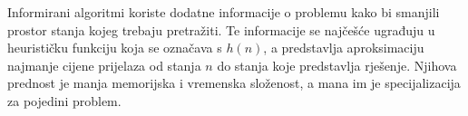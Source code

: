 Informirani algoritmi  koriste dodatne informacije o problemu kako bi smanjili prostor stanja kojeg trebaju pretražiti. 
Te informacije se najčešće ugrađuju u heurističku funkciju  koja se označava s \( h(n) \), a predstavlja aproksimaciju najmanje cijene prijelaza od stanja \( n \) do stanja koje predstavlja rješenje.
Njihova prednost je manja memorijska i vremenska složenost, a mana im je specijalizacija za pojedini problem.